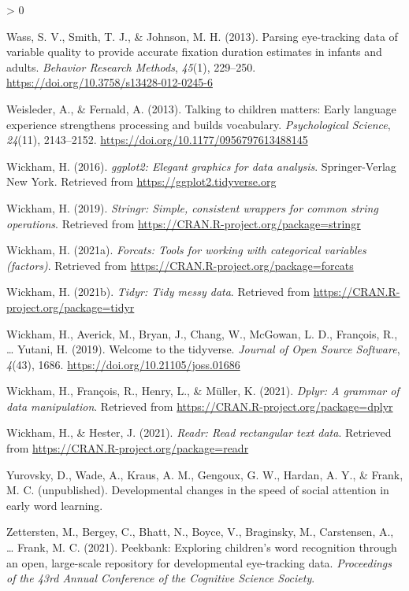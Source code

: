 \documentclass[
  english,
  man,floatsintext]{apa6}
\newlength{\cslhangindent}
\newenvironment{CSLReferences}[2] %
 {%
  \setlength{\parindent}{0pt}
  \ifodd #1 \everypar{\setlength{\hangindent}{\cslhangindent}}\ignorespaces\fi
  \ifnum #2 > 0
  \setlength{\parskip}{#2\baselineskip}
  \fi
 }%
 {}
\begin{document}
\begin{CSLReferences}{1}{0}
\leavevmode\hypertarget{ref-Wass2013}{}%
Wass, S. V., Smith, T. J., \& Johnson, M. H. (2013). {Parsing eye-tracking data of variable quality to provide accurate fixation duration estimates in infants and adults.} \emph{Behavior Research Methods}, \emph{45}(1), 229--250. \url{https://doi.org/10.3758/s13428-012-0245-6}

\leavevmode\hypertarget{ref-Weisleder2013}{}%
Weisleder, A., \& Fernald, A. (2013). {Talking to children matters: Early language experience strengthens processing and builds vocabulary}. \emph{Psychological Science}, \emph{24}(11), 2143--2152. \url{https://doi.org/10.1177/0956797613488145}

\leavevmode\hypertarget{ref-R-ggplot2}{}%
Wickham, H. (2016). \emph{ggplot2: Elegant graphics for data analysis}. Springer-Verlag New York. Retrieved from \url{https://ggplot2.tidyverse.org}

\leavevmode\hypertarget{ref-R-stringr}{}%
Wickham, H. (2019). \emph{Stringr: Simple, consistent wrappers for common string operations}. Retrieved from \url{https://CRAN.R-project.org/package=stringr}

\leavevmode\hypertarget{ref-R-forcats}{}%
Wickham, H. (2021a). \emph{Forcats: Tools for working with categorical variables (factors)}. Retrieved from \url{https://CRAN.R-project.org/package=forcats}

\leavevmode\hypertarget{ref-R-tidyr}{}%
Wickham, H. (2021b). \emph{Tidyr: Tidy messy data}. Retrieved from \url{https://CRAN.R-project.org/package=tidyr}

\leavevmode\hypertarget{ref-R-tidyverse}{}%
Wickham, H., Averick, M., Bryan, J., Chang, W., McGowan, L. D., François, R., \ldots{} Yutani, H. (2019). Welcome to the {tidyverse}. \emph{Journal of Open Source Software}, \emph{4}(43), 1686. \url{https://doi.org/10.21105/joss.01686}

\leavevmode\hypertarget{ref-R-dplyr}{}%
Wickham, H., François, R., Henry, L., \& Müller, K. (2021). \emph{Dplyr: A grammar of data manipulation}. Retrieved from \url{https://CRAN.R-project.org/package=dplyr}

\leavevmode\hypertarget{ref-R-readr}{}%
Wickham, H., \& Hester, J. (2021). \emph{Readr: Read rectangular text data}. Retrieved from \url{https://CRAN.R-project.org/package=readr}

\leavevmode\hypertarget{ref-YurovskyWadeKrausUnpub}{}%
Yurovsky, D., Wade, A., Kraus, A. M., Gengoux, G. W., Hardan, A. Y., \& Frank, M. C. (unpublished). {Developmental changes in the speed of social attention in early word learning}.

\leavevmode\hypertarget{ref-zettersten2021}{}%
Zettersten, M., Bergey, C., Bhatt, N., Boyce, V., Braginsky, M., Carstensen, A., \ldots{} Frank, M. C. (2021). Peekbank: Exploring children's word recognition through an open, large-scale repository for developmental eye-tracking data. \emph{Proceedings of the 43rd Annual Conference of the Cognitive Science Society}.

\end{CSLReferences}

\endgroup
\end{document}
